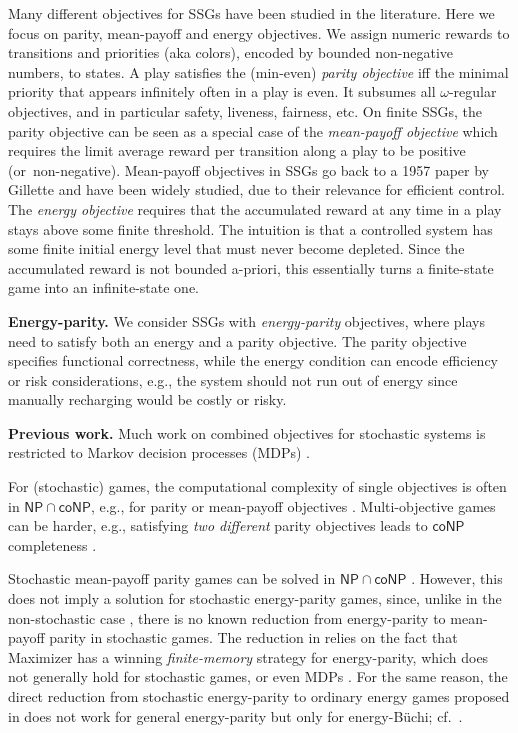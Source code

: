 \documentclass[a4paper,UKenglish,cleveref,autoref,thm-restate]{lipics-v2021}
\newcommand{\+}[1]{\mathbb{#1}}
\newcommand{\?}[1]{\mathcal{#1}}
\newcommand{\NP}{\ensuremath{\mathsf{NP}}}
\newcommand{\coNP}{\ensuremath{\mathsf{coNP}}}
\begin{document}
Many different objectives for SSGs have been studied in the literature.
Here we focus on parity, mean-payoff and energy objectives.
We assign numeric rewards to transitions and priorities
(aka colors), encoded by bounded non-negative numbers, to states.
A play satisfies the (min-even) {\em parity objective} iff
the minimal priority that appears infinitely often in a play is even.
It subsumes all $\omega$-regular objectives, and in particular safety,
liveness, fairness, etc.
On finite SSGs, the parity objective can be seen as a special case of
the {\em mean-payoff objective} which requires the limit average reward per
transition along a play to be positive (or\ non-negative).
Mean-payoff objectives in SSGs
go back to a 1957 paper by Gillette \cite{gillette1957stochastic} and have
been widely studied, due to their relevance for efficient control.
The {\em energy objective} \cite{chakrabarti2003resource} requires that the
accumulated reward at any time in a play stays above some finite threshold.
The intuition is that a controlled system has some finite initial energy level
that must never become depleted.
Since the accumulated reward is not bounded a-priori, this essentially turns a finite-state game into an infinite-state one.

{\bf Energy-parity.}
We consider SSGs with \emph{energy-parity} objectives,
where plays need to satisfy both an energy and a parity objective.
The parity objective specifies functional correctness, while the energy
condition can encode efficiency or risk considerations, e.g., the system
should not run out of energy since manually recharging would be costly or risky.

{\bf Previous work.}
Much work on combined objectives for stochastic systems is 
restricted to Markov decision processes (MDPs)
\cite{CD2011,chatterjee2011games,BKN2016,MSTW2017}.

For (stochastic) games, the computational complexity of single
objectives is often in $\NP\cap \coNP$, e.g., for parity or mean-payoff
objectives \cite{jurdzinski1998deciding}.
Multi-objective games can be harder, e.g.,
satisfying \emph{two different} parity objectives 
leads to $\coNP$ completeness \cite{DBLP:conf/fossacs/ChatterjeeHP07}.

Stochastic mean-payoff parity games can be solved in $\NP \cap \coNP$
\cite{CDGQ:2014}. However, this does not imply a solution for
stochastic energy-parity games, since, unlike in the non-stochastic
case \cite{CD2010}, there is no known reduction from energy-parity to mean-payoff parity
in stochastic games.
The reduction in \cite{CD2010} relies on the fact that
Maximizer has a winning \emph{finite-memory} strategy for energy-parity, which does
not generally hold for stochastic games, or even MDPs \cite{MSTW2017}.
For the same reason, the direct reduction from stochastic energy-parity to ordinary
energy games proposed in \cite{CD2011,chatterjee2011games} does not work
for general energy-parity but only for energy-B\"uchi; cf.~\cite{MSTW2017}.
\end{document}
